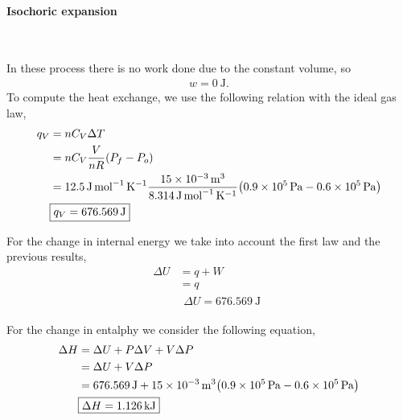 \documentclass[main.tex]{subfiles}
\begin{document}
\paragraph{Isochoric expansion}~

In these process there is no work done due to the constant volume, so 
\begin{gather*}
    \boxed{w = \SI{0}{\joule}.}
\end{gather*}
To compute the heat exchange, we use the following relation with the ideal gas law,
\begin{align*}
    q_V &= nC_V\Delta T \\
    &= nC_V\frac{V}{nR}\qty(P_f-P_o) \\
    &= \SI{12.5}{\joule\per\mol\per\kelvin}\frac{\SI{15d-3}{\meter\tothe{3}}}{\SI{8.314}{\joule\per\mole\per\kelvin}}\qty(\SI{0.9d5}{\pascal}-\SI{0.6d5}{\pascal}) \\
    &\begin{gathered}
        \boxed{q_V = \SI{676.569}{\joule}}
    \end{gathered}
\end{align*}

For the change in internal energy we take into account the first law and the previous results,
\begin{align*}
    \Delta U &= q + W \\
    &= q \\
    &\begin{gathered}
        \boxed{\Delta U = \SI{676.569}{\joule}}
    \end{gathered}
\end{align*}

For the change in entalphy we consider the following equation,
\begin{align*}
    \Delta H &= \Delta U + P\Delta V + V\Delta P \\
    &= \Delta U + V\Delta P \\
    &= \SI{676.569}{\joule} + \SI{15d-3}{\meter\tothe{3}}\qty(\SI{0.9d5}{\pascal}-\SI{0.6d5}{\pascal}) \\
    &\begin{gathered}
        \boxed{\Delta H =\SI{1.126}{\kilo\joule}}
    \end{gathered}
\end{align*}

\end{document}
